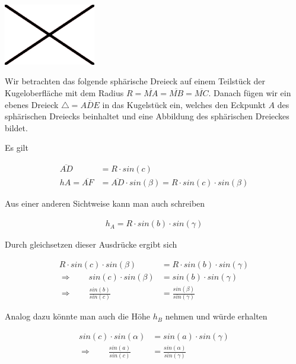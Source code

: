 \begin{refsection}
\begin{center}
        \includegraphics[width=0.3\textwidth]{kugel/Beispielbild.jpg}
\end{center}


Wir betrachten das folgende sphärische Dreieck auf einem Teilstück der Kugeloberfläche mit dem Radius $R= \overline{MA} = \overline{MB} = \overline{MC}$. Danach fügen wir ein ebenes Dreieck $\triangle=\overline{ADE}$ in das Kugelstück ein, welches den Eckpunkt $A$ des sphärischen Dreiecks beinhaltet und eine Abbildung des sphärischen Dreieckes bildet.

Es gilt

\begin{align*}
\overline{AD} &= R \cdot sin (c) \\
hA = \overline{AF} &= \overline{AD} \cdot sin(\beta) = R \cdot sin(c) \cdot sin(\beta)  
\end{align*}

Aus einer anderen Sichtweise kann man auch schreiben

\begin{align*}
h_{A} = R \cdot sin(b) \cdot sin(\gamma)  
\end{align*}

Durch gleichsetzen dieser Ausdrücke ergibt sich

\begin{align*}
R \cdot sin(c) \cdot sin(\beta) &= R \cdot sin(b) \cdot sin(\gamma) \\
\Rightarrow \quad \quad
sin(c) \cdot sin(\beta) &= sin(b) \cdot sin(\gamma) \\
\Rightarrow \quad \quad
\frac{sin (b)}{sin (c)} &= \frac{sin (\beta)}{sin (\gamma)}
\end{align*}

Analog dazu könnte man auch die Höhe $h_{B}$ nehmen und würde erhalten

\begin{align*}
sin(c) \cdot sin(\alpha) &= sin(a) \cdot sin(\gamma) \\
\Rightarrow \quad \quad
\frac{sin (a)}{sin (c)} &= \frac{sin (\alpha)}{sin (\gamma)}
\end{align*}


\end{refsection}
